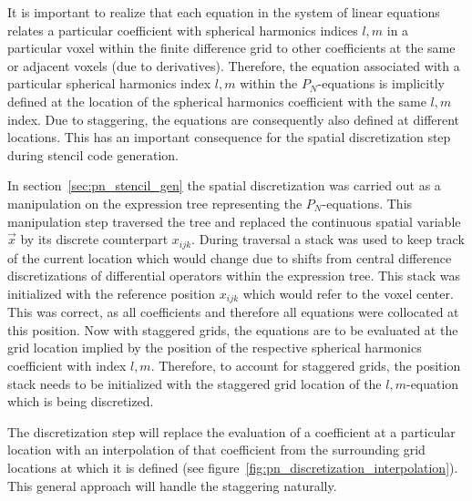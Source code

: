 It is important to realize that each equation in the system of linear equations relates a particular coefficient with spherical harmonics indices $l,m$ in a particular voxel within the finite difference grid to other coefficients at the same or adjacent voxels (due to derivatives). Therefore, the equation associated with a particular spherical harmonics index $l,m$ within the $P_N$-equations is implicitly defined at the location of the spherical harmonics coefficient with the same $l,m$ index. Due to staggering, the equations are consequently also defined at different locations. This has an important consequence for the spatial discretization step during stencil code generation.

In section~\ref{sec:pn_stencil_gen} the spatial discretization was carried out as a manipulation on the expression tree representing the $P_N$-equations. This manipulation step traversed the tree and replaced the continuous spatial variable $\vec{x}$ by its discrete counterpart $x_{ijk}$. During traversal a stack was used to keep track of the current location which would change due to shifts from central difference discretizations of differential operators within the expression tree. This stack was initialized with the reference position $x_{ijk}$ which would refer to the voxel center. This was correct, as all coefficients and therefore all equations were collocated at this position. Now with staggered grids, the equations are to be evaluated at the grid location implied by the position of the respective spherical harmonics coefficient with index $l,m$. Therefore, to account for staggered grids, the position stack needs to be initialized with the staggered grid location of the $l,m$-equation which is being discretized.

The discretization step will replace the evaluation of a coefficient at a particular location with an interpolation of that coefficient from the surrounding grid locations at which it is defined (see figure~\ref{fig:pn_discretization_interpolation}). This general approach will handle the staggering naturally.

